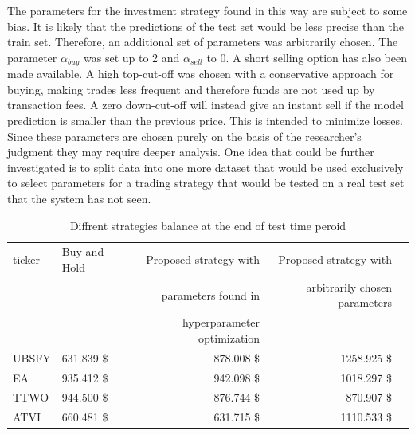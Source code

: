 \documentclass[11pt]{article} %
\begin{document}
The parameters for the investment strategy found in this way are subject to some bias. It is likely that the predictions of the test set would be less precise than the train set. Therefore, an additional set of parameters was arbitrarily chosen. The parameter $\alpha_{buy}$  was set up to 2 and $\alpha_{sell}$  to 0. A short selling option has also been made available.  A high top-cut-off was chosen with a conservative approach for buying, making trades less frequent and therefore funds are not used up by transaction fees. A zero down-cut-off will instead give an instant sell if the model prediction is smaller than the previous price. This is intended to minimize losses. Since these parameters are chosen purely on the basis of the researcher's judgment they may require deeper analysis. One idea that could be further investigated is to split data into one more dataset that would be used exclusively to select parameters for a trading strategy that would be tested on a real test set that the system has not seen. 

\begin{table}[H]
\centering
\caption{Diffrent strategies balance at the end of test time peroid}
\begin{tabular}{llrrr}
\toprule
 ticker &  Buy and Hold &  Proposed strategy with  &  Proposed strategy with  \\
  &        &                                        parameters found in  &                                           arbitrarily chosen parameters \\
  &        &                                         hyperparameter optimization &                                            \\

 \midrule
  UBSFY &       631.839 \$&                                            878.008 \$ &                                           1258.925 \$\\
    EA &       935.412 \$&                                           942.098 \$&                                           1018.297 \$\\
   TTWO &       944.500 \$&                                            876.744 \$&                                            870.907 \$\\
   ATVI &       660.481 \$&                                            631.715 \$&                                           1110.533 \$\\
\bottomrule
\end{tabular}
\end{table}
\end{document}
